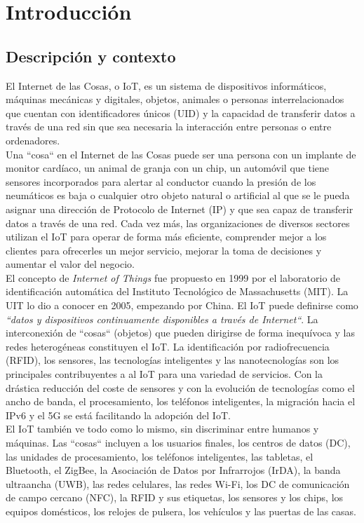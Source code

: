 \chapter{Introducción}

\section{Descripción y contexto}

El Internet de las Cosas, o IoT, es un sistema de dispositivos informáticos, máquinas mecánicas y digitales, objetos, animales o personas interrelacionados que cuentan con identificadores únicos (UID) y la capacidad de transferir datos a través de una red sin que sea necesaria la interacción entre personas o entre ordenadores. \cite{serpanos2018internet} \\

Una ``cosa`` en el Internet de las Cosas puede ser una persona con un implante de monitor cardíaco, un animal de granja con un chip, un automóvil que tiene sensores incorporados para alertar al conductor cuando la presión de los neumáticos es baja o cualquier otro objeto natural o artificial al que se le pueda asignar una dirección de Protocolo de Internet (IP) y que sea capaz de transferir datos a través de una red. Cada vez más, las organizaciones de diversos sectores utilizan el IoT para operar de forma más eficiente, comprender mejor a los clientes para ofrecerles un mejor servicio, mejorar la toma de decisiones y aumentar el valor del negocio. \\


El concepto de \textit{Internet of Things} fue propuesto en 1999 por el laboratorio de identificación automática del Instituto Tecnológico de Massachusetts (MIT). La UIT lo dio a conocer en 2005, empezando por China. El IoT puede definirse como \textit{``datos y dispositivos continuamente disponibles a través de Internet``}. La interconexión de ``cosas`` (objetos) que pueden dirigirse de forma inequívoca y las redes heterogéneas constituyen el IoT. La identificación por radiofrecuencia (RFID), los sensores, las tecnologías inteligentes y las nanotecnologías son los principales contribuyentes a al IoT para una variedad de servicios. Con la drástica reducción del coste de sensores y con la evolución de tecnologías como el ancho de banda, el procesamiento, los teléfonos inteligentes, la migración hacia el IPv6 y el 5G se está facilitando la adopción del IoT.\\

El IoT también ve todo como lo mismo, sin discriminar entre humanos y máquinas. Las ``cosas`` incluyen a los usuarios finales, los centros de datos (DC), las unidades de procesamiento, los teléfonos inteligentes, las tabletas, el Bluetooth, el ZigBee, la Asociación de Datos por Infrarrojos (IrDA), la banda ultraancha (UWB), las redes celulares, las redes Wi-Fi, los DC de comunicación de campo cercano (NFC), la RFID y sus etiquetas, los sensores y los chips, los equipos domésticos, los relojes de pulsera, los vehículos y las puertas de las casas. \cite{lea2020iot} \\

